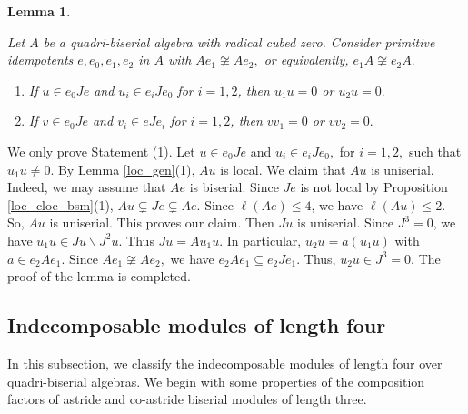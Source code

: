\documentclass[10pt]{amsart}
\newtheorem{Lemma}[Theo]{Lemma}
\theoremstyle{definition}
\begin{document}
\begin{Lemma}\label{sbsa} 

Let $A$ be a quadri-biserial algebra with radical cubed zero. Consider primitive idempotents $e, e_0, e_1, e_2$ in $A$ with $Ae_1\not\cong Ae_2,$ or equivalently, 
$e_1A\not\cong e_2A.$ 
 
\begin{enumerate}[$(1)$]

\vspace{-2pt}

\item If $u\in e_0Je$ and $u_i \in e_iJe_0$ for $i=1, 2$, then $u_1u=0$ or $u_2u=0.$

\item If $v\in e_0Je$ and $v_i\in eJe_i$ for $i=1, 2$, then $vv_1=0$ or $vv_2=0.$
    
\end{enumerate}\end{Lemma}

\vspace{-1.5pt}

 We only prove Statement (1). Let $u\in e_0Je$ and $u_i \in e_iJe_0,$ for $i=1, 2,$ such that $u_1u\ne 0$. By Lemma \ref{loc_gen}(1), $Au$ is local. We claim that $Au$ is uniserial. Indeed, we may assume that $Ae$ is biserial. Since $Je$ is not local by Proposition \ref{loc_cloc_bsm}(1), $Au \subsetneq Je \subsetneq Ae.$ Since $\ell(Ae)\le 4$, we have $\ell(Au)\le 2.$ So, $Au$ is uniserial. This proves our claim. Then $Ju$ is uniserial. Since $J^3=0$, we have $u_1u\in Ju\backslash J^2u$. Thus $Ju=Au_1u.$ In particular, $u_2u=a(u_1u)$ with $a\in e_2Ae_1$. Since $Ae_1\not\cong Ae_2,$ we have $e_2Ae_1 \subseteq e_2Je_1.$ Thus, $u_2u\in J^3=0.$ The proof of the lemma is completed.

\subsection{\sc Indecomposable modules of length four} In this subsection, we classify the indecomposable modules of length four over quadri-biserial algebras. We begin with some properties of the composition factors of astride and co-astride biserial modules of length three.
\end{document}
